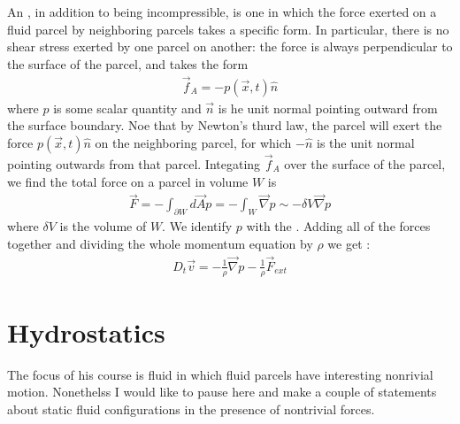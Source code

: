 \documentclass[letterpaper,10pt,english]{jupyterBook}
\begin{document}
\sphinxAtStartPar
An , in addition to being incompressible, is one in which
the force exerted on a fluid parcel by neighboring parcels takes a specific
form. In particular, there is no shear stress exerted by one parcel on another:
the force is always perpendicular to the surface of the parcel, and takes the
form
\begin{equation*}
\begin{split}{\vec f}_A = - p({\vec x},t) {\hat n}\end{split}
\end{equation*}
\sphinxAtStartPar
where \(p\) is some scalar quantity and \({\vec n}\) is he unit normal pointing
outward from the surface boundary. Noe that by Newton’s thurd law, the
parcel will exert the force \(p({\vec x},t) {\hat n}\) on the neighboring
parcel, for which \(-{\hat n}\) is the unit normal pointing outwards from
that parcel. Integating \({\vec f}_A\) over the surface of the parcel,
we find the total force on a parcel in volume \(W\) is
\begin{equation*}
\begin{split}{\vec F} = - \int_{{\partial W}} d{\vec A} p = - \int_W
{\vec \nabla} p \sim - \delta V {\vec \nabla} p\end{split}
\end{equation*}
\sphinxAtStartPar
where \(\delta V\) is the volume of \(W\). We identify \(p\) with the .
Adding all of the forces together and dividing the whole momentum
equation by \(\rho\) we get :
\begin{equation*}
\begin{split}D_t {\vec v} = - \frac{1}{\rho} {\vec \nabla} p 
- \frac{1}{\rho} {\vec F}_{ext}\end{split}
\end{equation*}

\section{Hydrostatics}
\label{\detokenize{chapter1/Hydrostatics:hydrostatics}}\label{\detokenize{chapter1/Hydrostatics::doc}}
\sphinxAtStartPar
The focus of his course is fluid  in which fluid parcels
have interesting nonrivial motion. Nonethelss I would like to pause here
and make a couple of statements about static fluid configurations
in the presence of nontrivial forces.
\end{document}
